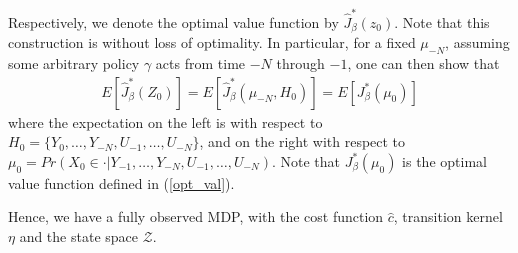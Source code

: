 \documentclass[letterpaper, 10 pt, conference]{ieeeconf}  %
\def\P{{\mathcal P}}
\theoremstyle{definition}
\theoremstyle{remark}
\begin{document}
Respectively, we denote the optimal value function by $\hat{J}^*_\beta(z_0)$. Note that this construction is without loss of optimality. In particular, for a fixed $\mu_{-N}$, assuming some arbitrary policy $\gamma$ acts from time $-N$ through $-1$, one can then show that 
\begin{align*}
E\left[ \hat{J}_\beta^*(Z_0)\right] = E\left[ \hat{J}_\beta^*(\mu_{-N} , H_0)\right] = E[J_\beta^*(\mu_0)]
\end{align*}
where the expectation on the left is with respect to $H_0=\{Y_0,\dots,Y_{-N},U_{-1},\dots, U_{-N} \}$, and on the right with respect to $\mu_{0}=Pr(X_{0}\in \cdot|Y_{-1},\dots,Y_{-N},U_{-1},\dots,U_{-N})$. Note that $J_\beta^*(\mu_0)$ is the optimal value function defined in (\ref{opt_val}). 


Hence, we have a fully observed MDP, with the cost function $\hat{c}$, transition kernel ${\eta}$ and the state space ${\mathcal{Z}}$.


\end{document}
